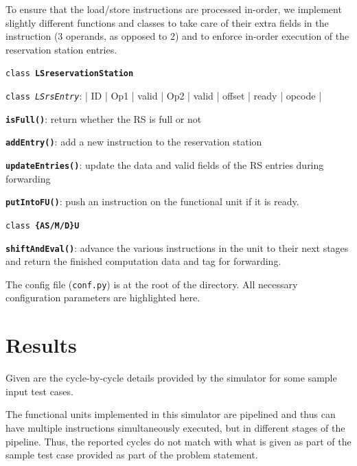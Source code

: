 \documentclass[12pt,a4paper,english]{paper}
\newenvironment{results}{%
  \def\FrameCommand{%
    \hspace{1pt}%
    {\color{blue}\vrule width 2pt}%
    {\color{formalblue}\vrule width 4pt}%
    \colorbox{formalblue}%
  }%
  \MakeFramed{\advance\hsize-\width\FrameRestore}%
  \noindent\hspace{-4.55pt}%
  \begin{adjustwidth}{7pt}{}%
  \vspace{2pt}\vspace{2pt}%
}
{%
  \vspace{2pt}\end{adjustwidth}\endMakeFramed%
}
\begin{document}
    To ensure that the load/store instructions are processed in-order, we implement slightly different functions and classes to take care of their extra fields in the instruction (3 operands, as opposed to 2) and to enforce in-order execution of the reservation station entries.
    \begin{compactitem}
        \item \texttt{class \textbf{LSreservationStation}}
        \begin{compactitem}
            \item \texttt{class \textit{LSrsEntry}}: | ID | Op1 | valid | Op2 | valid | offset | ready | opcode |
            \item \texttt{\textbf{isFull()}}: return whether the RS is full or not
            \item \texttt{\textbf{addEntry()}}: add a new instruction to the reservation station
            \item \texttt{\textbf{updateEntries()}}: update the data and valid fields of the RS entries during forwarding
            \item \texttt{\textbf{putIntoFU()}}: push an instruction on the functional unit if it is ready.
        \end{compactitem}
        \item \texttt{class \textbf{\{AS/M/D\}U}}
        \begin{compactitem}
            \item \texttt{\textbf{shiftAndEval()}}: advance the various instructions in the unit to their next stages and return the finished computation data and tag for forwarding.
        \end{compactitem}
    \end{compactitem}
    
    The config file (\texttt{conf.py}) is at the root of the directory. All necessary configuration parameters are highlighted here.
    
\section{Results}
Given are the cycle-by-cycle details provided by the simulator for some sample input test cases.

\begin{results}
    The functional units implemented in this simulator are pipelined and thus can have multiple instructions simultaneously executed, but in different stages of the pipeline. Thus, the reported cycles do not match with what is given as part of the sample test case provided as part of the problem statement.
\end{results}
\end{document}
